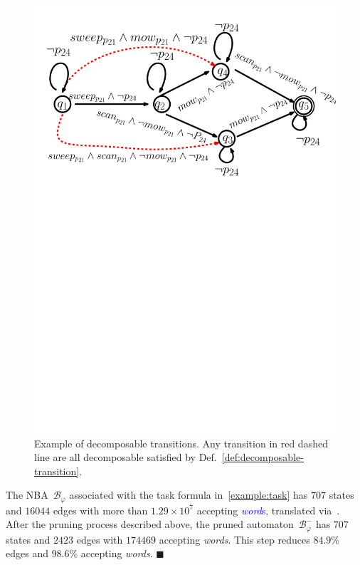 

\begin{figure}
\centering
\includegraphics[scale=0.35]{figures/example_decomposable.pdf}
\caption{
Example of decomposable transitions.
Any transition in red dashed line are all
decomposable satisfied by Def.~\ref{def:decomposable-transition}.}
\label{fig:example_decomposable}
\end{figure}

\begin{example}\label{eq:prune-nba}
The NBA~$\mathcal{B}_{\varphi}$ associated with the task formula in~\eqref{example:task}
has $707$ states and $16044$ edges with more than $1.29\times10^7$ accepting \textcolor{blue}{\emph{word}s},
translated via~\citep{gastin2001fast}.
After the pruning process described above, the pruned automaton~$\mathcal{B}^{-}_{\varphi}$
has $707$ states and $2423$ edges with $174469$ accepting \emph{words}. This step reduces $84.9\%$ edges and $98.6\%$
accepting \emph{words}.
\hfill $\blacksquare$
\end{example}
